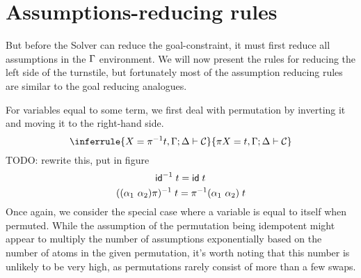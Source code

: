 \documentclass[english, mgr]{iithesis}
\begin{document}
\section{Assumptions-reducing rules}
But before the Solver can reduce the goal-constraint, it must first reduce all assumptions in the $\Gamma$ environment.
We will now present the rules for reducing the left side of the turnstile,
but fortunately most of the assumption reducing rules are similar to the goal reducing analogues.

For variables equal to some term,
we first deal with permutation by inverting it and moving it to the right-hand side.
$$
\inferrule{
   \termv = \pi^{-1} \term, \cEnv ; \icEnv \solverRule \sconstr
}{
   \pi \termv = \term, \cEnv ; \icEnv \solverRule \sconstr
}
$$
TODO: rewrite this, put in figure
$$
  \mathsf{id} ^ {-1} \;t = \mathsf{id}\;t
$$
$$
  ((\alpha_1\ \alpha_2) \pi) ^ {-1} \;t = \pi^{-1}(\alpha_1\ \alpha_2) \;t
$$
Once again, we consider the special case where a variable is equal to itself when permuted.
While the assumption of the permutation being idempotent might appear to multiply the number of assumptions exponentially based on the number of atoms in the given permutation,
it's worth noting that this number is unlikely to be very high, as permutations rarely consist of more than a few swaps.
\end{document}
